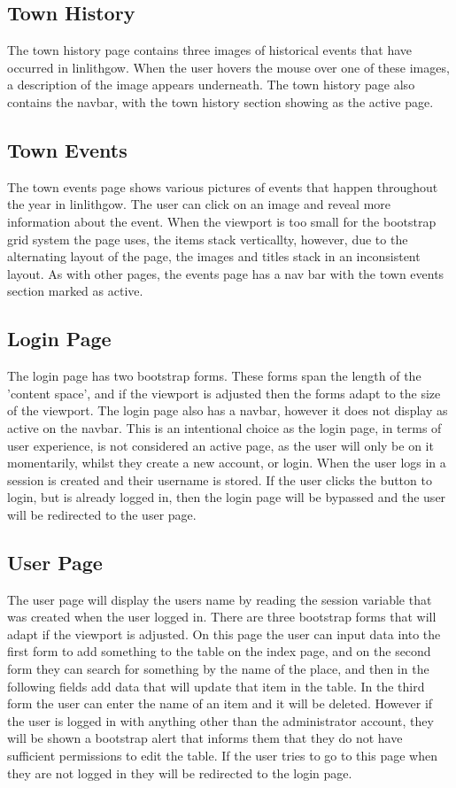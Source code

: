 \documentclass[12pt,a4paper]{article}
\begin{document}
		\subsection{Town History}
		The town history page contains three images of historical events that have occurred in linlithgow. When the user hovers the mouse over one of these images, a description of the image appears underneath. The town history page also contains the navbar, with the town history section showing as the active page.

		\subsection{Town Events}
		The town events page shows various pictures of events that happen throughout the year in linlithgow. The user can click on an image and reveal more information about the event. When the viewport is too small for the bootstrap grid system the page uses, the items stack verticallty, however, due to the alternating layout of the page, the images and titles stack in an inconsistent layout. As with other pages, the events page has a nav bar with the town events section marked as active.

		\subsection{Login Page}
		The login page has two bootstrap forms. These forms span the length of the 'content space', and if the viewport is adjusted then the forms adapt to the size of the viewport. The login page also has a navbar, however it does not display as active on the navbar. This is an intentional choice as the login page, in terms of user experience, is not considered an active page, as the user will only be on it momentarily, whilst they create a new account, or login. When the user logs in a session is created and their username is stored. If the user clicks the button  to login, but is already logged in, then the login page will be bypassed and the user will be redirected to the user page.

		\subsection{User Page}
		The user page will display the users name by reading the session variable that was created when the user logged in. There are three bootstrap forms that will adapt if the viewport is adjusted. On this page the user can input data into the first form to add something to the table on the index page, and on the second form they can search for something by the name of the place, and then in the following fields add data that will update that item in the table. In the third form the user can enter the name of an item and it will be deleted. However if the user is logged in with anything other than the administrator account, they will be shown a bootstrap alert that informs them that they do not have sufficient permissions to edit the table. If the user tries to go to this page when  they are not logged in they will be redirected to the login page.
\end{document}
